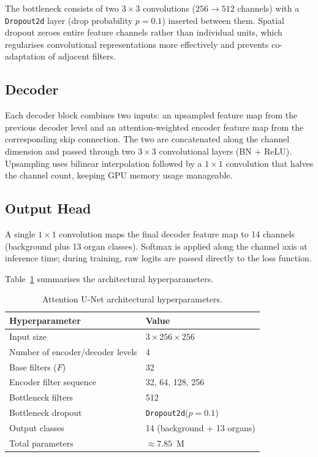 The bottleneck consists of two $3 \times 3$ convolutions ($256 \to 512$ channels) with a \texttt{Dropout2d} layer (drop probability $p = 0.1$) inserted between them. Spatial dropout zeroes entire feature channels rather than individual units, which regularises convolutional representations more effectively and prevents co-adaptation of adjacent filters.

\subsection{Decoder}

Each decoder block combines two inputs: an upsampled feature map from the previous decoder level and an attention-weighted encoder feature map from the corresponding skip connection. The two are concatenated along the channel dimension and passed through two $3 \times 3$ convolutional layers (BN $+$ ReLU). Upsampling uses bilinear interpolation followed by a $1 \times 1$ convolution that halves the channel count, keeping GPU memory usage manageable.

\subsection{Output Head}

A single $1 \times 1$ convolution maps the final decoder feature map to 14 channels (background plus 13 organ classes). Softmax is applied along the channel axis at inference time; during training, raw logits are passed directly to the loss function.

Table~\ref{tab:arch_params} summarises the architectural hyperparameters.

\begin{table}[h!]
\centering
\caption{Attention U-Net architectural hyperparameters.}
\label{tab:arch_params}
\begin{tabular}{ll}
\toprule
\textbf{Hyperparameter} & \textbf{Value} \\
\midrule
Input size              & $3 \times 256 \times 256$ \\
Number of encoder/decoder levels & 4 \\
Base filters ($F$)      & 32 \\
Encoder filter sequence & 32, 64, 128, 256 \\
Bottleneck filters      & 512 \\
Bottleneck dropout      & \texttt{Dropout2d}($p = 0.1$) \\
Output classes          & 14 (background + 13 organs) \\
Total parameters        & $\approx 7.85$~M \\
\bottomrule
\end{tabular}
\end{table}

